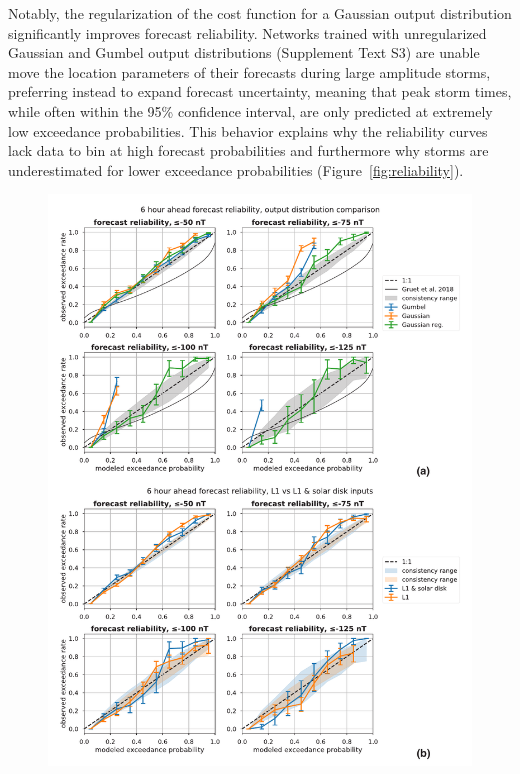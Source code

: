\documentclass[draft,linenumbers]{agujournal2018}
\begin{document}
Notably, the regularization of the cost function for a Gaussian output distribution significantly improves forecast reliability. Networks trained with unregularized Gaussian and Gumbel output distributions (Supplement Text S3) are unable move the location parameters of their forecasts during large amplitude storms, preferring instead to expand forecast uncertainty, meaning that peak storm times, while often within the 95\% confidence interval, are only predicted at extremely low exceedance probabilities. This behavior explains why the reliability curves lack data to bin at high forecast probabilities and furthermore why storms are underestimated for lower exceedance probabilities (Figure~\ref{fig:reliability}).

\begin{figure}[p]
  \centering
  \includegraphics[width=1.1\textwidth]{figure4.pdf} 
\end{figure}
\clearpage
\end{document}
